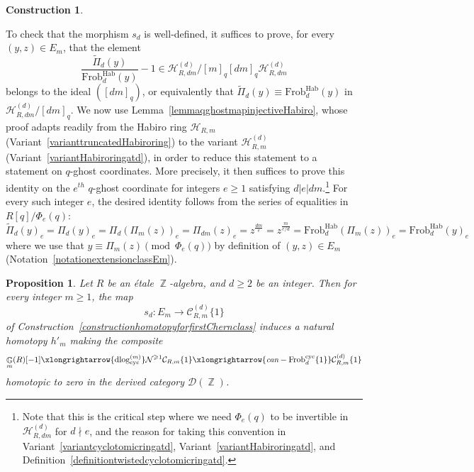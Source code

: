 \documentclass[10pt,twoside]{scrarticle}
\newlength{\len}
\newtheorem{proposition}[theorem]{Proposition}
\theoremstyle{definition}
\newtheorem{construction}[theorem]{Construction}
\DeclareMathOperator{\Z}{\mathbb{Z}}
\DeclareMathOperator{\G}{\mathbb{G}}
\newcommand{\CRm}{\mathcal{C}_{R,m}}
\newcommand{\Frob}{\mathrm{Frob}}
\newcommand{\Cyc}{\mathrm{cyc}}
\newcommand{\Hab}{\mathrm{Hab}}
\renewcommand{\ge}{\geqslant}
\renewcommand{\geq}{\geqslant}
\newcommand{\dlog}{\mathrm{dlog}}
\numberwithin{equation}{theorem}
\begin{document}
\begin{construction}
\begin{itemize}
    \end{itemize}
    To check that the morphism $s_d$ is well-defined, it suffices to prove, for every $(y,z)\in E_m$, that the element
    $$\frac{\tilde{\Pi}_d(y)}{\Frob_d^{\Hab}(y)}-1\in \mathcal{H}_{R,dm}^{(d)}/[m]_q[dm]_q \mathcal{H}_{R,dm}^{(d)}$$ belongs to the ideal $([dm]_q)$, or equivalently that $\tilde{\Pi}_d(y) \equiv \Frob_d^{\Hab}(y)$ in $\mathcal{H}_{R,dm}^{(d)}/[dm]_q$. We now use Lemma~\ref{lemmaqghostmapinjectiveHabiro}, whose proof adapts readily from the Habiro ring $\mathcal{H}_{R,m}$ (Variant~\ref{varianttruncatedHabiroring}) to the variant $\mathcal{H}_{R,m}^{(d)}$ (Variant~\ref{variantHabiroringatd}), in order to reduce this statement to a statement on $q$-ghost coordinates.  
    More precisely, it then suffices to prove this identity on the $e^{th}$ $q$-ghost coordinate for integers $e \ge 1$ satisfying $d|e|dm$.\footnote{Note that this is the critical step where we need $\Phi_e(q)$ to be invertible in $\mathcal{H}_{R,dm}^{(d)}$ for $d \nmid e$, and the reason for taking this convention in Variant~\ref{variantcyclotomicringatd}, Variant~\ref{variantHabiroringatd}, and Definition~\ref{definitiontwistedcyclotomicringatd}.} 
    For every such integer $e$, the desired identity follows from the series of equalities in~$R[q]/\Phi_e(q)$:
    $$\tilde{\Pi}_d(y)_e = \Pi_d(y)_e= \Pi_d(\Pi_m(z))_e = \Pi_{dm}(z)_e = z^{\frac{dm}{e}} = z^{\frac{m}{e/d}} = \Frob_d^{\Hab}(\Pi_m(z))_e = \Frob_d^{\Hab}(y)_e$$
    where we use that $y\equiv \Pi_m(z)\pmod{\Phi_e(q)}$ by definition of $(y,z) \in E_m$ (Notation~\ref{notationextensionclassEm}).
\end{construction}

\begin{proposition}\label{propositionfirstChernclasszero}
    Let $R$ be an étale $\Z$-algebra, and $d \geq 2$ be an integer. Then for every integer $m \ge 1$, the map $$s_d : E_m \longrightarrow \CRm^{(d)}\{1\}$$ 
    of Construction~\ref{constructionhomotopyforfirstChernclass} induces a natural homotopy $h'_m$ making the composite
    $$\G_m(R)[-1] \xlongrightarrow{\dlog_\Cyc^{(m)}} \mathcal{N}^{\ge 1} \mathcal{C}_{R,m}\{1\} \xlongrightarrow{\emph{can} - \Frob_d^{\Cyc}\{1\}} \mathcal{C}^{(d)}_{R,m}\{1\}$$
    homotopic to zero in the derived category $\mathcal{D}(\Z)$.
\end{proposition}
\end{document}
